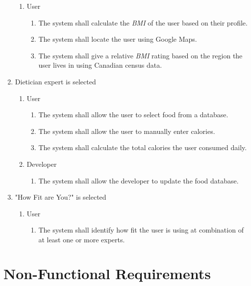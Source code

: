 \documentclass[12pt,letterpaper]{article}
\begin{document}
\begin{enumerate}[{BE}1. ]
	\begin{enumerate}[{VP4}.1]
		\item User
			\begin{enumerate}
				\item The system shall calculate the \textit{BMI} of the user based on their profile.
				\item The system shall locate the user using Google Maps.
				\item The system shall give a relative \textit{BMI} rating based on the region the user lives in using Canadian census data.
			\end{enumerate}
	\end{enumerate}
	\item Dietician expert is selected
	\begin{enumerate}[{VP5}.1]
		\item User
			\begin{enumerate}
				\item The system shall allow the user to select food from a database.
				\item The system shall allow the user to manually enter calories.
				\item The system shall calculate the total calories the user consumed daily.
			\end{enumerate}
		\item Developer
			\begin{enumerate}
				\item The system shall allow the developer to update the food database.
			\end{enumerate}
	\end{enumerate}
	\item "How Fit are You?" is selected
	\begin{enumerate}[{VP2}.1]
		\item User
			\begin{enumerate}
				\item The system shall identify how fit the user is using at combination of at least one or more experts.
			\end{enumerate}
	\end{enumerate}
	
\end{enumerate}

\section{Non-Functional Requirements}
\label{sec:non-functional_requirements}
\end{document}
